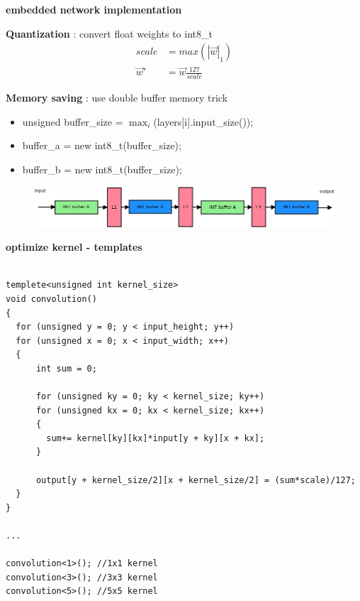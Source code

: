 \documentclass[xcolor=dvipsnames]{beamer}
\begin{document}
\begin{frame}{\bf embedded network implementation}

{\bf Quantization} : convert float weights to int8\_t
\begin{align*}
  scale &= max{(|\vec{w}|_1)} \\
  \vec{w}' &= \vec{w}\frac{127}{scale}
\end{align*}


{\bf Memory saving} : use double buffer memory trick

\begin{itemize}
  \item unsigned buffer\_size = $\max_{i}$(layers[i].input\_size());
  \item buffer\_a = new int8\_t(buffer\_size);
  \item buffer\_b = new int8\_t(buffer\_size);
\end{itemize}

\begin{figure}
  \includegraphics[scale=0.3]{../images/nn_memory.png}
\end{figure}

\end{frame}


\begin{frame}[fragile]
{\bf optimize kernel - templates}


\begin{lstlisting}

templete<unsigned int kernel_size>
void convolution()
{
  for (unsigned y = 0; y < input_height; y++)
  for (unsigned x = 0; x < input_width; x++)
  {
      int sum = 0;

      for (unsigned ky = 0; ky < kernel_size; ky++)
      for (unsigned kx = 0; kx < kernel_size; kx++)
      {
        sum+= kernel[ky][kx]*input[y + ky][x + kx];
      }

      output[y + kernel_size/2][x + kernel_size/2] = (sum*scale)/127;
  }
}

...

convolution<1>(); //1x1 kernel
convolution<3>(); //3x3 kernel
convolution<5>(); //5x5 kernel
\end{lstlisting}
\end{frame}
\end{document}
